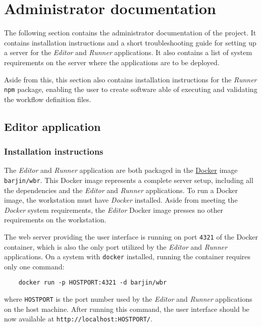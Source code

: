 
\section{Administrator documentation}

The following section contains the administrator documentation of the project.
It contains installation instructions and a short troubleshooting guide for setting up a server for the \textit{Editor} and \textit{Runner} applications. 
It also contains a list of system requirements on the server where the applications are to be deployed.

Aside from this, this section also contains installation instructions for the \textit{Runner} \texttt{npm} package, enabling the user to create software able of executing and validating the workflow definition files.

\subsection{Editor application}


\subsubsection{Installation instructions}

The \textit{Editor} and \textit{Runner} application are both packaged in the \href{https://www.docker.com/}{Docker} image \texttt{barjin/wbr}.
This Docker image represents a complete server setup, including all the dependencies and the \textit{Editor} and \textit{Runner} applications.
To run a Docker image, the workstation must have \textit{Docker} installed. 
Aside from meeting the \textit{Docker} system requirements, the \textit{Editor} Docker image presses no other requirements on the workstation.

The web server providing the user interface is running on port \texttt{4321} of the Docker container, which is also the only port utilized by the \textit{Editor} and \textit{Runner} applications.
On a system with \texttt{docker} installed, running the container requires only one command:

\begin{verbatim}
    docker run -p HOSTPORT:4321 -d barjin/wbr
\end{verbatim}
where \texttt{HOSTPORT} is the port number used by the \textit{Editor} and \textit{Runner} applications on the host machine.
After running this command, the user interface should be now available at \texttt{http://localhost:HOSTPORT/}.

